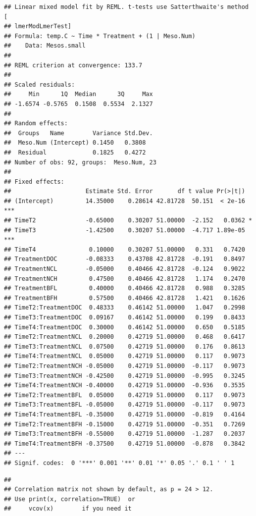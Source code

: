 \documentclass[
]{article}
\begin{document}
\begin{verbatim}
## Linear mixed model fit by REML. t-tests use Satterthwaite's method [
## lmerModLmerTest]
## Formula: temp.C ~ Time * Treatment + (1 | Meso.Num)
##    Data: Mesos.small
## 
## REML criterion at convergence: 133.7
## 
## Scaled residuals: 
##     Min      1Q  Median      3Q     Max 
## -1.6574 -0.5765  0.1508  0.5534  2.1327 
## 
## Random effects:
##  Groups   Name        Variance Std.Dev.
##  Meso.Num (Intercept) 0.1450   0.3808  
##  Residual             0.1825   0.4272  
## Number of obs: 92, groups:  Meso.Num, 23
## 
## Fixed effects:
##                     Estimate Std. Error       df t value Pr(>|t|)    
## (Intercept)         14.35000    0.28614 42.81728  50.151  < 2e-16 ***
## TimeT2              -0.65000    0.30207 51.00000  -2.152   0.0362 *  
## TimeT3              -1.42500    0.30207 51.00000  -4.717 1.89e-05 ***
## TimeT4               0.10000    0.30207 51.00000   0.331   0.7420    
## TreatmentDOC        -0.08333    0.43708 42.81728  -0.191   0.8497    
## TreatmentNCL        -0.05000    0.40466 42.81728  -0.124   0.9022    
## TreatmentNCH         0.47500    0.40466 42.81728   1.174   0.2470    
## TreatmentBFL         0.40000    0.40466 42.81728   0.988   0.3285    
## TreatmentBFH         0.57500    0.40466 42.81728   1.421   0.1626    
## TimeT2:TreatmentDOC  0.48333    0.46142 51.00000   1.047   0.2998    
## TimeT3:TreatmentDOC  0.09167    0.46142 51.00000   0.199   0.8433    
## TimeT4:TreatmentDOC  0.30000    0.46142 51.00000   0.650   0.5185    
## TimeT2:TreatmentNCL  0.20000    0.42719 51.00000   0.468   0.6417    
## TimeT3:TreatmentNCL  0.07500    0.42719 51.00000   0.176   0.8613    
## TimeT4:TreatmentNCL  0.05000    0.42719 51.00000   0.117   0.9073    
## TimeT2:TreatmentNCH -0.05000    0.42719 51.00000  -0.117   0.9073    
## TimeT3:TreatmentNCH -0.42500    0.42719 51.00000  -0.995   0.3245    
## TimeT4:TreatmentNCH -0.40000    0.42719 51.00000  -0.936   0.3535    
## TimeT2:TreatmentBFL  0.05000    0.42719 51.00000   0.117   0.9073    
## TimeT3:TreatmentBFL -0.05000    0.42719 51.00000  -0.117   0.9073    
## TimeT4:TreatmentBFL -0.35000    0.42719 51.00000  -0.819   0.4164    
## TimeT2:TreatmentBFH -0.15000    0.42719 51.00000  -0.351   0.7269    
## TimeT3:TreatmentBFH -0.55000    0.42719 51.00000  -1.287   0.2037    
## TimeT4:TreatmentBFH -0.37500    0.42719 51.00000  -0.878   0.3842    
## ---
## Signif. codes:  0 '***' 0.001 '**' 0.01 '*' 0.05 '.' 0.1 ' ' 1
\end{verbatim}

\begin{verbatim}
## 
## Correlation matrix not shown by default, as p = 24 > 12.
## Use print(x, correlation=TRUE)  or
##     vcov(x)        if you need it
\end{verbatim}
\end{document}

